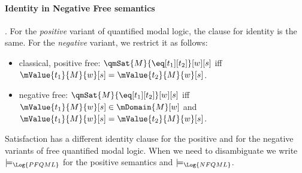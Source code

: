 \documentclass[../../../../include/open-logic-section]{subfiles}
\begin{document}
\paragraph{Identity in Negative Free semantics}. For the \emph{positive}
variant of quantified modal logic, the clause for identity
is the same. For the \emph{negative} variant, we restrict it 
as follows:

\begin{itemize}

\item classical, positive free: $\qmSat{M}{\eq[t_1][t_2]}[w][s]$ iff
  $\mValue{t_1}{M}{w}[s] = \mValue{t_2}{M}{w}[s]$.

\item negative free: $\qmSat{M}{\eq[t_1][t_2]}[w][s]$ iff
  $\mValue{t_1}{M}{w}[s]\in \mDomain{M}[w]$ and 
  $\mValue{t_1}{M}{w}[s] = \mValue{t_2}{M}{w}[s]$.

\end{itemize}

Satisfaction has a different identity clause for the 
positive and for the negative variants of free quantified 
modal logic. When we need to disambiguate we write
 $\models_{\Log{PFQML}}$ for the positive semantics and
 $\models_{\Log{NFQML}}$. 
\end{document}
